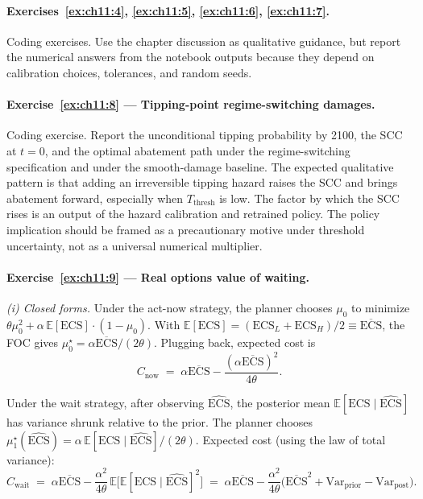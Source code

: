 \documentclass[11pt,a4paper]{report}
\begin{document}
\paragraph{Exercises~\ref{ex:ch11:4}, \ref{ex:ch11:5}, \ref{ex:ch11:6}, \ref{ex:ch11:7}.}
Coding exercises.  Use the chapter discussion as qualitative guidance, but report the numerical answers from the notebook outputs because they depend on calibration choices, tolerances, and random seeds.

\paragraph{Exercise~\ref{ex:ch11:8} --- Tipping-point regime-switching damages.}
Coding exercise.  Report the unconditional tipping probability by 2100, the SCC at $t=0$, and the optimal abatement path under the regime-switching specification and under the smooth-damage baseline.  The expected qualitative pattern is that adding an irreversible tipping hazard raises the SCC and brings abatement forward, especially when $T_\mathrm{thresh}$ is low.  The factor by which the SCC rises is an output of the hazard calibration and retrained policy.  The policy implication should be framed as a precautionary motive under threshold uncertainty, not as a universal numerical multiplier.

\paragraph{Exercise~\ref{ex:ch11:9} --- Real options value of waiting.}
\emph{(i) Closed forms.}  Under the act-now strategy, the planner chooses $\mu_0$ to minimize $\theta\mu_0^2 + \alpha\,\mathbb{E}[\mathrm{ECS}]\cdot(1 - \mu_0)$.  With $\mathbb{E}[\mathrm{ECS}] = (\mathrm{ECS}_L + \mathrm{ECS}_H)/2 \equiv \overline{\mathrm{ECS}}$, the FOC gives $\mu_0^\star = \alpha \overline{\mathrm{ECS}}/(2\theta)$.  Plugging back, expected cost is
\[
   C_\mathrm{now} \;=\; \alpha \overline{\mathrm{ECS}} - \frac{(\alpha \overline{\mathrm{ECS}})^2}{4\theta}.
\]

Under the wait strategy, after observing $\widehat{\mathrm{ECS}}$, the posterior mean $\mathbb{E}[\mathrm{ECS}\mid\widehat{\mathrm{ECS}}]$ has variance shrunk relative to the prior.  The planner chooses $\mu_1^\star(\widehat{\mathrm{ECS}}) = \alpha\,\mathbb{E}[\mathrm{ECS}\mid\widehat{\mathrm{ECS}}]/(2\theta)$.  Expected cost (using the law of total variance):
\[
   C_\mathrm{wait} \;=\; \alpha \overline{\mathrm{ECS}} - \frac{\alpha^2}{4\theta}\,\mathbb{E}\bigl[\mathbb{E}[\mathrm{ECS}\mid\widehat{\mathrm{ECS}}]^2\bigr]
   \;=\; \alpha \overline{\mathrm{ECS}} - \frac{\alpha^2}{4\theta}\bigl(\overline{\mathrm{ECS}}^2 + \mathrm{Var}_\mathrm{prior} - \mathrm{Var}_\mathrm{post}\bigr).
\]
\end{document}
